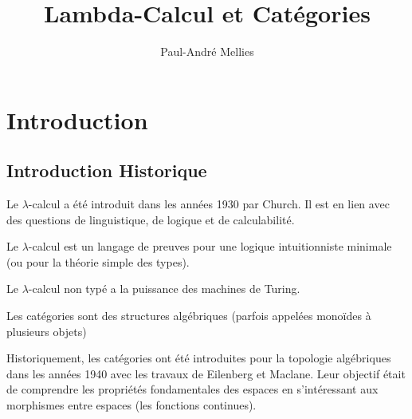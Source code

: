 \documentclass[math, info]{cours}
\title{Lambda-Calcul et Catégories}
\author{Paul-André Mellies}
\begin{document}
\bettertitle

\section{Introduction}
\subsection{Introduction Historique}
Le $\lambda$-calcul a été introduit dans les années 1930 par Church.
Il est en lien avec des questions de linguistique, de logique et de calculabilité.
\begin{definition}
	Le $\lambda$-calcul est un langage de preuves pour une logique intuitionniste minimale (ou pour la théorie simple des types).
	\label{def:lambdacalcul}
\end{definition}
Le $\lambda$-calcul non typé a la puissance des machines de Turing.

\begin{definition}
	Les catégories sont des structures algébriques (parfois appelées monoïdes à plusieurs objets)
	\label{def:categoryyyyyyyy}
\end{definition}
Historiquement, les catégories ont été introduites pour la topologie algébriques dans les années 1940 avec les travaux de Eilenberg et Maclane.
Leur objectif était de comprendre les propriétés fondamentales des espaces en s'intéressant aux morphismes entre espaces (les fonctions continues).
\end{document}
